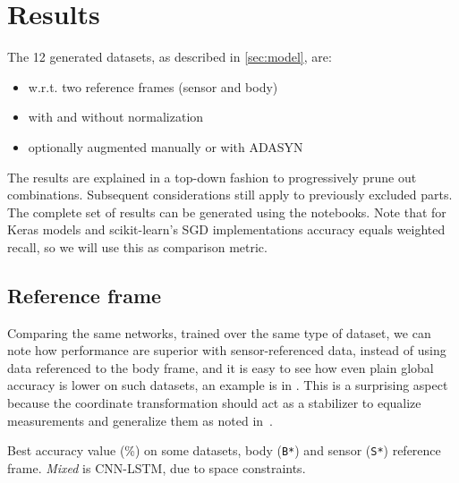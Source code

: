 
\section{Results}\label{sec:results}

The 12 generated datasets, as described in \autoref{sec:model}, are:
\begin{itemize}
    \item w.r.t. two reference frames (sensor and body)
    \item with and without normalization
    \item optionally augmented manually or with ADASYN
\end{itemize}
The results are explained in a top-down fashion to progressively prune out combinations.
Subsequent considerations still apply to previously excluded parts.
The complete set of results can be generated using the notebooks.
Note that for Keras models and scikit-learn's SGD implementations accuracy equals weighted recall, so we will use this as comparison metric.


\subsection{Reference frame}
Comparing the same networks, trained over the same type of dataset, we can note how performance are superior with sensor-referenced data, instead of using data referenced to the body frame, and it is easy to see how even plain global accuracy is lower on such datasets, an example is in .
This is a surprising aspect because the coordinate transformation should act as a stabilizer to equalize measurements and generalize them as noted in~\cite{Liano-HMM}.

\begin{table}[ht]
\centering
\caption{Best accuracy value (\%) on some datasets, body (\texttt{B*}) and sensor (\texttt{S*}) reference frame. \textit{Mixed} is CNN-LSTM, due to space constraints.}
\label{tab:body_sensor}

\end{table}

